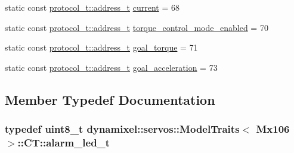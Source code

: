 \begin{DoxyCompactItemize}
\item 
static const \hyperlink{classdynamixel_1_1protocols_1_1_protocol1_a4383ba392b57ea00dd0273c6da5e8a65}{protocol\+\_\+t\+::address\+\_\+t} \hyperlink{structdynamixel_1_1servos_1_1_model_traits_3_01_mx106_01_4_1_1_c_t_a76023cc6cc7e671d58cae11f74ea1830}{current} = 68
\item 
static const \hyperlink{classdynamixel_1_1protocols_1_1_protocol1_a4383ba392b57ea00dd0273c6da5e8a65}{protocol\+\_\+t\+::address\+\_\+t} \hyperlink{structdynamixel_1_1servos_1_1_model_traits_3_01_mx106_01_4_1_1_c_t_a15618c19842b4c285b5ca23348ba0fb2}{torque\+\_\+control\+\_\+mode\+\_\+enabled} = 70
\item 
static const \hyperlink{classdynamixel_1_1protocols_1_1_protocol1_a4383ba392b57ea00dd0273c6da5e8a65}{protocol\+\_\+t\+::address\+\_\+t} \hyperlink{structdynamixel_1_1servos_1_1_model_traits_3_01_mx106_01_4_1_1_c_t_aa3b23e6a3a914c1241c5374bcb987e1b}{goal\+\_\+torque} = 71
\item 
static const \hyperlink{classdynamixel_1_1protocols_1_1_protocol1_a4383ba392b57ea00dd0273c6da5e8a65}{protocol\+\_\+t\+::address\+\_\+t} \hyperlink{structdynamixel_1_1servos_1_1_model_traits_3_01_mx106_01_4_1_1_c_t_ad2a009182a438a4f90b5d9c370d33ad1}{goal\+\_\+acceleration} = 73
\end{DoxyCompactItemize}


\subsection{Member Typedef Documentation}
\subsubsection[{\texorpdfstring{alarm\+\_\+led\+\_\+t}{alarm_led_t}}]{\setlength{\rightskip}{0pt plus 5cm}typedef uint8\+\_\+t {\bf dynamixel\+::servos\+::\+Model\+Traits}$<$ {\bf Mx106} $>$\+::{\bf C\+T\+::alarm\+\_\+led\+\_\+t}}\hypertarget{structdynamixel_1_1servos_1_1_model_traits_3_01_mx106_01_4_1_1_c_t_a798058506f81517dff42eca7d1514529}{}\label{structdynamixel_1_1servos_1_1_model_traits_3_01_mx106_01_4_1_1_c_t_a798058506f81517dff42eca7d1514529}
